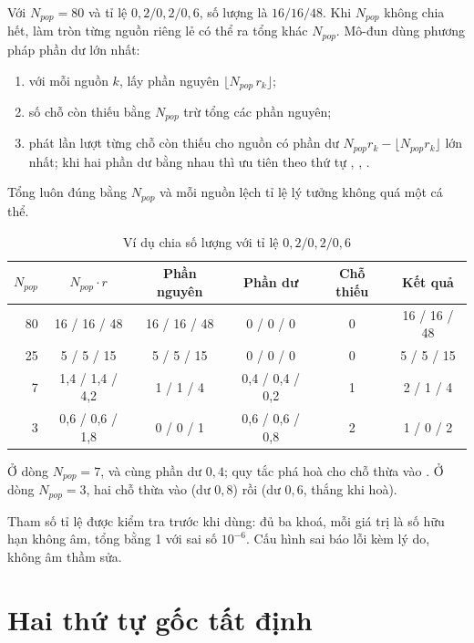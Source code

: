 Với $N_{pop} = 80$ và tỉ lệ $0{,}2/0{,}2/0{,}6$, số lượng là $16/16/48$. Khi $N_{pop}$ không chia hết,
làm tròn từng nguồn riêng lẻ có thể ra tổng khác $N_{pop}$. Mô-đun dùng phương pháp phần dư lớn nhất:
\begin{enumerate}
  \item với mỗi nguồn $k$, lấy phần nguyên $\lfloor N_{pop}\, r_k \rfloor$;
  \item số chỗ còn thiếu bằng $N_{pop}$ trừ tổng các phần nguyên;
  \item phát lần lượt từng chỗ còn thiếu cho nguồn có phần dư $N_{pop} r_k - \lfloor N_{pop} r_k
        \rfloor$ lớn nhất; khi hai phần dư bằng nhau thì ưu tiên theo thứ tự , ,
        .
\end{enumerate}
Tổng luôn đúng bằng $N_{pop}$ và mỗi nguồn lệch tỉ lệ lý tưởng không quá một cá thể.

\begin{table}[H]
\centering
\caption{Ví dụ chia số lượng với tỉ lệ $0{,}2/0{,}2/0{,}6$}
\label{tab:quota}
\begin{tabular}{@{}rccccc@{}}
\toprule
$N_{pop}$ & $N_{pop}\cdot r$ & Phần nguyên & Phần dư & Chỗ thiếu & Kết quả \\
\midrule
80 & 16 / 16 / 48 & 16 / 16 / 48 & 0 / 0 / 0 & 0 & 16 / 16 / 48 \\
25 & 5 / 5 / 15 & 5 / 5 / 15 & 0 / 0 / 0 & 0 & 5 / 5 / 15 \\
7 & 1,4 / 1,4 / 4,2 & 1 / 1 / 4 & 0,4 / 0,4 / 0,2 & 1 & 2 / 1 / 4 \\
3 & 0,6 / 0,6 / 1,8 & 0 / 0 / 1 & 0,6 / 0,6 / 0,8 & 2 & 1 / 0 / 2 \\
\bottomrule
\end{tabular}
\end{table}

Ở dòng $N_{pop} = 7$,  và  cùng phần dư $0{,}4$; quy tắc phá hoà cho chỗ thừa vào
. Ở dòng $N_{pop} = 3$, hai chỗ thừa vào  (dư $0{,}8$) rồi  (dư $0{,}6$,
thắng  khi hoà).

Tham số tỉ lệ được kiểm tra trước khi dùng: đủ ba khoá, mỗi giá trị là số hữu hạn không âm, tổng bằng 1
với sai số $10^{-6}$. Cấu hình sai báo lỗi  kèm lý do, không âm thầm sửa.

\section{Hai thứ tự gốc tất định}

